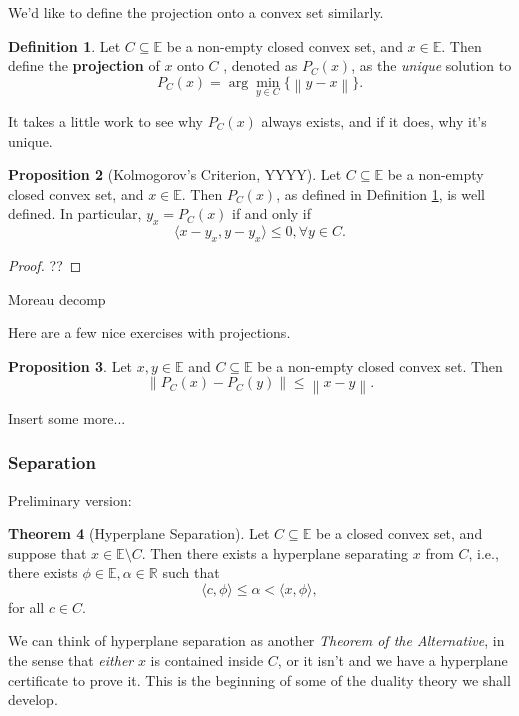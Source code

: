 \documentclass{article}
\numberwithin{equation}{section}
\theoremstyle{definition}
\newtheorem{theorem}{Theorem}[section]
\newtheorem{proposition}[theorem]{Proposition}
\newtheorem{definition}[theorem]{Definition}%
\newcommand{\bE}{\mathbb{E}}
\newcommand{\bR}{\mathbb{R}}
\newcommand{\norm}[1]{\left\lVert#1\right\rVert}
\begin{document}
We'd like to define the projection onto a convex set similarly.
\begin{definition}
    \label{defprojectioncvx}%
    Let $C\subseteq\bE$ be a non-empty closed convex set, and $x\in\bE$. Then define the \textbf{projection} of $x$ onto $C$ , denoted as $P_C(x)$, as the \textit{unique} solution to
    \begin{equation}
        P_C(x)=\arg\min_{y\in C}\{\norm{y-x}\}.
    \end{equation}
\end{definition}
It takes a little work to see why $P_C(x)$ always exists, and if it does, why it's unique. 
\begin{proposition}[Kolmogorov's Criterion, YYYY]
    Let $C\subseteq\bE$ be a non-empty closed convex set, and $x\in\bE$. Then $P_C(x)$, as defined in Definition \ref{defprojectioncvx}, is well defined. In particular, $y_x=P_C(x)$ if and only if
    \begin{equation}
        \langle x-y_x, y-y_x\rangle\le0, \forall y\in C.
    \end{equation}
\end{proposition}
\begin{proof}
??
\end{proof}

Moreau decomp

Here are a few nice exercises with projections.
\begin{proposition}
    Let $x,y\in\bE$ and $C\subseteq\bE$ be a non-empty closed convex set. Then
    \begin{equation}
        \norm{P_C(x)-P_C(y)} \le \norm{x-y}.
    \end{equation}
\end{proposition}
Insert some more...
\subsubsection{Separation}
Preliminary version:
\begin{theorem}[Hyperplane Separation]
    \label{thmhyperplanesep}%
    Let $C\subseteq\bE$ be a closed convex set, and suppose that $x\in\bE\setminus C$. Then there exists a hyperplane separating $x$ from $C$, i.e., there exists $\phi\in\bE,\alpha\in\bR$ such that
    \begin{equation}
        \langle c,\phi\rangle\le\alpha<\langle x,\phi\rangle,
    \end{equation}
    for all $c\in C$.
\end{theorem}
We can think of hyperplane separation as another \textit{Theorem of the Alternative}, in the sense that \textit{either} $x$ is contained inside $C$, or it isn't and we have a hyperplane certificate to prove it. This is the beginning of some of the duality theory we shall develop.
\end{document}
